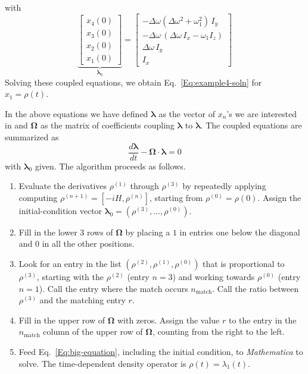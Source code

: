 with
\begin{equation}
\underbrace{\begin{bmatrix} 
x_4(0) \\ x_3(0) \\ x_2(0) \\ x_1(0) 
\end{bmatrix}}_{{\bm{\lambda}}_0}
=
\begin{bmatrix}
	- \Delta\omega (\Delta\omega^2 + \omega_1^2) \, I_y \\
	-\Delta\omega \, (\Delta\omega \, I_x - \omega_1 I_z)  \\
	\Delta \omega \, I_y \\
	I_x 
\end{bmatrix}
\end{equation}
Solving these coupled equations, we obtain Eq.~\ref{Eq:example4-soln} for $x_1 = \rho(t)$.  

In the above equations we have defined $\bm{\lambda}$ as the vector of $x_n$'s we are interested in and $\bm{\Omega}$ as the matrix of coefficients coupling $\bm{\lambda}$ to $\dot{\bm{\lambda}}$.  The coupled equations are summarized as
\begin{equation}
\frac{d \bm{\lambda}}{d t} 
	- \bm{\Omega} \cdot \bm{\lambda} 
	= 0
	\label{Eq:big-equation}
\end{equation} 
with $\bm{\lambda}_0$ given.  The  algorithm proceeds as follows.
\begin{enumerate}

\item Evaluate the derivatives $\rho^{(1)}$ through $\rho^{(3)}$ by repeatedly applying computing $\rho^{(n+1)} = [-i H, \rho^{(n)}]$, starting from $\rho^{(0)} = \rho(0)$.  Assign the initial-condition vector ${\bm{\lambda}}_0 = (\rho^{(3)}, \ldots, \rho^{(0)})$.

\item Fill in the lower 3 rows of $\bm{\Omega}$ by placing a $1$ in entries one below the diagonal and $0$ in all the other positions.

\item  Look for an entry in the list $(\rho^{(2)}, \rho^{(1)}, \rho^{(0)})$ that is proportional to $\rho^{(3)}$, starting with the $\rho^{(2)}$ (entry $n = 3$) and working towards $\rho^{(0)}$ (entry $n = 1$). Call the entry where the match occurs $n_{\text{match}}$. Call the ratio between $\rho^{(3)}$ and the matching entry $r$.

\item Fill in the upper row of $\bm{\Omega}$ with zeros.  Assign the value $r$ to the entry in the $n_{\text{match}}$ column of the upper row of $\bm{\Omega}$, counting from the right to the left.  

\item Feed Eq.~\ref{Eq:big-equation}, including the initial condition, to \emph{Mathematica} to solve.  The time-dependent density operator is $\rho(t) = \lambda_{1}(t)$. 

\end{enumerate}
	